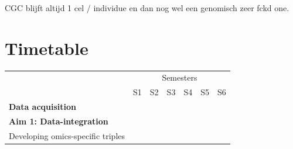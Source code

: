 \documentclass[twoside,fontsize=12pt]{article}
\begin{document}
CGC blijft altijd 1 cel / individue en dan nog wel een genomisch zeer fckd one.











\section*{Timetable}
\begin{table}[h]
\begin{center}
\begin{tabular}{lllllll}
                                                & \multicolumn{6}{c}{Semesters}                                                                                                                                                                                                                                                                                                                                                                                 \\ \cline{2-7} 
                                                & S1                                              & S2                                              & S3                                              & S4                                              & S5                                              & S6                                                                                          \\ \hline
\textbf{Data acquisition}               &           & \cellcolor[HTML]{343434}{\color[HTML]{656565} } & \cellcolor[HTML]{343434}{\color[HTML]{656565} } & \cellcolor[HTML]{343434}{\color[HTML]{656565} } & \cellcolor[HTML]{343434}{\color[HTML]{656565} } & \cellcolor[HTML]{343434}{\color[HTML]{656565} }   \\
\textbf{Aim 1: Data-integration}                & \cellcolor[HTML]{343434}                        & \cellcolor[HTML]{343434}                                             &                                                 &                                                 &                                                                                              \\
\hspace*{1em} Developing omics-specific triples & \cellcolor[HTML]{656565}                        &                                                 &                                                 &                                                 &                                                 &                                                                                                 \\

\end{tabular}
\end{center}
\end{table}
\end{document}
